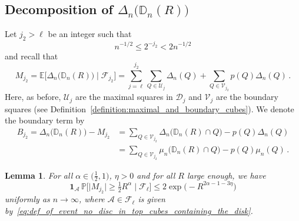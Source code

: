 \documentclass[11pt]{amsart}
\newtheorem{lemma}[theorem]{Lemma}
\theoremstyle{definition}
\theoremstyle{remark}
\numberwithin{equation}{section}
\newcommand{\bD}{\mathbb D}
\newcommand{\bP}{\mathbb P}
\newcommand{\bE}{\mathbb E}
\begin{document}
	\subsection{Decomposition of \texorpdfstring{$\Delta_n\big(\bD_n(R)\big)$}{ the discrepancy}}
	Let $j_2 > \ell$ be an integer such that 
	\begin{equation}
		\label{eq:def_of_j_2}
		n^{-1/2} \le 2^{-j_2} < 2n^{-1/2} 
	\end{equation}
	and recall that
	\begin{equation*}
		M_{j_2} = \bE\big[\Delta_n\big(\bD_n(R)\big) \mid \mathcal{F}_{j_2}\big] = \sum_{j=\ell}^{j_2} \sum_{Q\in \mathcal{U}_j} \Delta_n(Q) + \sum_{Q\in \mathcal{V}_{j_2}} p(Q) \Delta_n(Q) \, .
	\end{equation*}
	Here, as before, $\mathcal{U}_j$ are the maximal squares in $\mathcal{D}_j$ and $\mathcal{V}_j$ are the boundary squares (see Definition~\ref{definition:maximal_and_boundary_cubes}). We denote the boundary term by
	\begin{align}
		\label{eq:upper_bound_moderate_deviations_def_of_boundary_term}
		\nonumber
		B_{j_2} = \Delta_n\big(\bD_n(R)\big) - M_{j_2} &= \sum_{Q\in \mathcal{V}_{j_2}} \Delta_n\big(\bD_n(R) \cap Q\big) -  p(Q) \Delta_n(Q) \\ &= \sum_{Q\in \mathcal{V}_{j_2}} \mu_n\big(\bD_n(R) \cap Q\big) -  p(Q) \mu_n(Q) \, .
	\end{align}
	\begin{lemma}
		\label{lemma:upper_bound_moderate_deviations_martingale_term}
		For all $\alpha\in\big(\frac{1}{2},1\big)$, $\eta>0$ and for all $R$ large enough, we have
		\[
		\mathbf{1}_{\mathcal{A}} \, \bP\Big[\big| M_{j_2} \big| \ge \tfrac{1}{2} R^{\alpha} \mid \mathcal{F}_\ell\Big] \le 2\exp\Big(-R^{2\alpha -1 - 3\eta}\Big) 
		\]
		uniformly as $n\to \infty$, where $\mathcal{A}\in \mathcal{F}_{\ell}$ is given by~\eqref{eq:def_of_event_no_disc_in_top_cubes_containing_the_disk}.
	\end{lemma}
\end{document}
